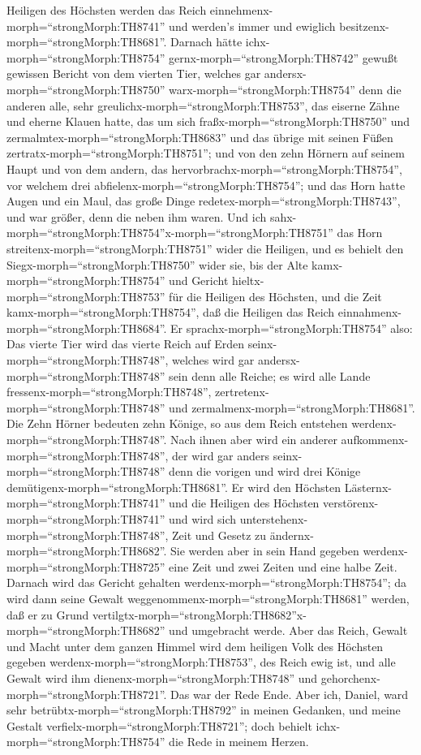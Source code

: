 Heiligen des Höchsten werden das Reich
einnehmenx-morph=``strongMorph:TH8741'' und werden's immer und ewiglich
besitzenx-morph=``strongMorph:TH8681''.  Darnach hätte
ichx-morph=``strongMorph:TH8754'' gernx-morph=``strongMorph:TH8742''
gewußt gewissen Bericht von dem vierten Tier, welches gar
andersx-morph=``strongMorph:TH8750'' warx-morph=``strongMorph:TH8754''
denn die anderen alle, sehr greulichx-morph=``strongMorph:TH8753'', das
eiserne Zähne und eherne Klauen hatte, das um sich
fraßx-morph=``strongMorph:TH8750'' und
zermalmtex-morph=``strongMorph:TH8683'' und das übrige mit seinen Füßen
zertratx-morph=``strongMorph:TH8751'';  und von den zehn
Hörnern auf seinem Haupt und von dem andern, das
hervorbrachx-morph=``strongMorph:TH8754'', vor welchem drei
abfielenx-morph=``strongMorph:TH8754''; und das Horn hatte Augen und ein
Maul, das große Dinge redetex-morph=``strongMorph:TH8743'', und war
größer, denn die neben ihm waren.  Und ich
sahx-morph=``strongMorph:TH8754''x-morph=``strongMorph:TH8751'' das Horn
streitenx-morph=``strongMorph:TH8751'' wider die Heiligen, und es
behielt den Siegx-morph=``strongMorph:TH8750'' wider sie, 
bis der Alte kamx-morph=``strongMorph:TH8754'' und Gericht
hieltx-morph=``strongMorph:TH8753'' für die Heiligen des Höchsten, und
die Zeit kamx-morph=``strongMorph:TH8754'', daß die Heiligen das Reich
einnahmenx-morph=``strongMorph:TH8684''.  Er
sprachx-morph=``strongMorph:TH8754'' also: Das vierte Tier wird das
vierte Reich auf Erden seinx-morph=``strongMorph:TH8748'', welches wird
gar andersx-morph=``strongMorph:TH8748'' sein denn alle Reiche; es wird
alle Lande fressenx-morph=``strongMorph:TH8748'',
zertretenx-morph=``strongMorph:TH8748'' und
zermalmenx-morph=``strongMorph:TH8681''.  Die Zehn Hörner
bedeuten zehn Könige, so aus dem Reich entstehen
werdenx-morph=``strongMorph:TH8748''. Nach ihnen aber wird ein anderer
aufkommenx-morph=``strongMorph:TH8748'', der wird gar anders
seinx-morph=``strongMorph:TH8748'' denn die vorigen und wird drei Könige
demütigenx-morph=``strongMorph:TH8681''.  Er wird den
Höchsten Lästernx-morph=``strongMorph:TH8741'' und die Heiligen des
Höchsten verstörenx-morph=``strongMorph:TH8741'' und wird sich
unterstehenx-morph=``strongMorph:TH8748'', Zeit und Gesetz zu
ändernx-morph=``strongMorph:TH8682''. Sie werden aber in sein Hand
gegeben werdenx-morph=``strongMorph:TH8725'' eine Zeit und zwei Zeiten
und eine halbe Zeit.  Darnach wird das Gericht gehalten
werdenx-morph=``strongMorph:TH8754''; da wird dann seine Gewalt
weggenommenx-morph=``strongMorph:TH8681'' werden, daß er zu Grund
vertilgtx-morph=``strongMorph:TH8682''x-morph=``strongMorph:TH8682'' und
umgebracht werde.  Aber das Reich, Gewalt und Macht unter
dem ganzen Himmel wird dem heiligen Volk des Höchsten gegeben
werdenx-morph=``strongMorph:TH8753'', des Reich ewig ist, und alle
Gewalt wird ihm dienenx-morph=``strongMorph:TH8748'' und
gehorchenx-morph=``strongMorph:TH8721''.  Das war der Rede
Ende. Aber ich, Daniel, ward sehr betrübtx-morph=``strongMorph:TH8792''
in meinen Gedanken, und meine Gestalt
verfielx-morph=``strongMorph:TH8721''; doch behielt
ichx-morph=``strongMorph:TH8754'' die Rede in meinem Herzen.

